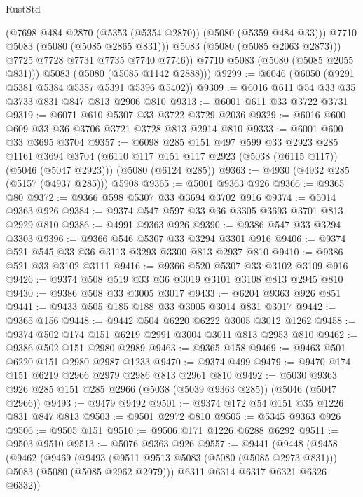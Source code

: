 \begin{lexlean}{RustStd}
\begin{coremodule}
                (@7698 @484 @2870 (@5353 (@5354 @2870)) (@5080 (@5359 @484 @33)))
                @7710
                @5083
                (@5080 (@5085 @2865 @831)))
              @5083
              (@5080 (@5085 @2063 @2873)))
            @7725
            @7728
            @7731
            @7735
            @7740
            @7746))
        @7710
        @5083
        (@5080 (@5085 @2055 @831)))
      @5083
      (@5080 (@5085 @1142 @2888)))
@9299 := @6046 (@6050 (@9291 @5381 @5384 @5387 @5391 @5396 @5402))
@9309 := @6016 @611 @54 @33 @35 @3733 @831 @847 @813 @2906 @810
@9313 := @6001 @611 @33 @3722 @3731
@9319 := @6071 @610 @5307 @33 @3722 @3729 @2036
@9329 := @6016 @600 @609 @33 @36 @3706 @3721 @3728 @813 @2914 @810
@9333 := @6001 @600 @33 @3695 @3704
@9357 := @6098
    @285
    @151
    @497
    @599
    @33
    @2923
    @285
    @1161
    @3694
    @3704
    (@6110 @117 @151 @117 @2923 (@5038 (@6115 @117)) (@5046 (@5047 @2923)))
    (@5080 (@6124 @285))
@9363 := @4930 (@4932 @285 (@5157 (@4937 @285))) @5908
@9365 := @5001 @9363 @926
@9366 := @9365 @80
@9372 := @9366 @598 @5307 @33 @3694 @3702 @916
@9374 := @5014 @9363 @926
@9384 := @9374 @547 @597 @33 @36 @3305 @3693 @3701 @813 @2929 @810
@9386 := @4991 @9363 @926
@9390 := @9386 @547 @33 @3294 @3303
@9396 := @9366 @546 @5307 @33 @3294 @3301 @916
@9406 := @9374 @521 @545 @33 @36 @3113 @3293 @3300 @813 @2937 @810
@9410 := @9386 @521 @33 @3102 @3111
@9416 := @9366 @520 @5307 @33 @3102 @3109 @916
@9426 := @9374 @508 @519 @33 @36 @3019 @3101 @3108 @813 @2945 @810
@9430 := @9386 @508 @33 @3005 @3017
@9433 := @6204 @9363 @926 @851
@9441 := @9433 @505 @185 @188 @33 @3005 @3014 @831 @3017
@9442 := @9365 @156
@9448 := @9442 @504 @6220 @6222 @3005 @3012 @1262
@9458 := @9374 @502 @174 @151 @6219 @2991 @3004 @3011 @813 @2953 @810
@9462 := @9386 @502 @151 @2980 @2989
@9463 := @9365 @158
@9469 := @9463 @501 @6220 @151 @2980 @2987 @1233
@9470 := @9374 @499
@9479 := @9470 @174 @151 @6219 @2966 @2979 @2986 @813 @2961 @810
@9492 := @5030 @9363 @926 @285 @151 @285 @2966 (@5038 (@5039 @9363 @285)) (@5046 (@5047 @2966))
@9493 := @9479 @9492
@9501 := @9374 @172 @54 @151 @35 @1226 @831 @847 @813
@9503 := @9501 @2972 @810
@9505 := @5345 @9363 @926
@9506 := @9505 @151
@9510 := @9506 @171 @1226 @6288 @6292
@9511 := @9503 @9510
@9513 := @5076 @9363 @926
@9557 := @9441
    (@9448
      (@9458
        (@9462
          (@9469
            (@9493 (@9511 @9513 @5083 (@5080 (@5085 @2973 @831))) @5083 (@5080 (@5085 @2962 @2979)))
            @6311
            @6314
            @6317
            @6321
            @6326
            @6332))

\end{coremodule}
\end{lexlean}
